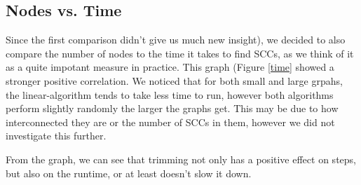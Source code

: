 \documentclass[../master/master.tex]{subfiles}
\begin{document}
\subsection{Nodes vs. Time}
Since the first comparison didn't give us much new insight), we decided to also compare the number of nodes to the time it takes to find SCCs, as we think of it as a quite impotant measure in practice. This graph (Figure \ref{time}  showed a stronger positive correlation. We noticed that for both small and large grpahs, the linear-algorithm tends to take less time to run, however both algorithms perform slightly randomly the larger the graphs get. This may be due to how interconnected they are or the number of SCCs in them, however we did not investigate this further.

From the graph, we can see that trimming not only has a positive effect on steps, but also on the runtime, or at least doesn't slow it down.
\end{document}
